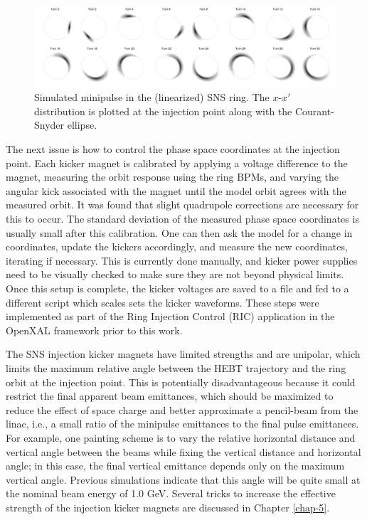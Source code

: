 %
%
\begin{figure}
    \centering
    \includegraphics[width=\textwidth]{Images/chapter1/minipulse_chromaticity_black.png}
    \caption{Simulated minipulse in the (linearized) SNS ring. The $x$-$x'$ distribution is plotted at the injection point along with the Courant-Snyder ellipse.}
    \label{fig:minipulse}
\end{figure}
%

The next issue is how to control the phase space coordinates at the injection point. Each kicker magnet is calibrated by applying a voltage difference to the magnet, measuring the orbit response using the ring BPMs, and varying the angular kick associated with the magnet until the model orbit agrees with the measured orbit. It was found that slight quadrupole corrections are necessary for this to occur. The standard deviation of the measured phase space coordinates is usually small after this calibration. One can then ask the model for a change in coordinates, update the kickers accordingly, and measure the new coordinates, iterating if necessary. This is currently done manually, and kicker power supplies need to be visually checked to make sure they are not beyond physical limits. Once this setup is complete, the kicker voltages are saved to a file and fed to a different script which scales sets the kicker waveforms. These steps were implemented as part of the Ring Injection Control (RIC) application in the OpenXAL framework \cite{Milas2021} prior to this work.

The SNS injection kicker magnets have limited strengths and are unipolar, which limits the maximum relative angle between the HEBT trajectory and the ring orbit at the injection point. This is potentially disadvantageous because it could restrict the final apparent beam emittances, which should be maximized to reduce the effect of space charge and better approximate a pencil-beam from the linac, i.e., a small ratio of the minipulse emittances to the final pulse emittances. For example, one painting scheme is to vary the relative horizontal distance and vertical angle between the beams while fixing the vertical distance and horizontal angle; in this case, the final vertical emittance depends only on the maximum vertical angle. Previous simulations indicate that this angle will be quite small at the nominal beam energy of 1.0 GeV. Several tricks to increase the effective strength of the injection kicker magnets are discussed in Chapter \ref{chap-5}.


